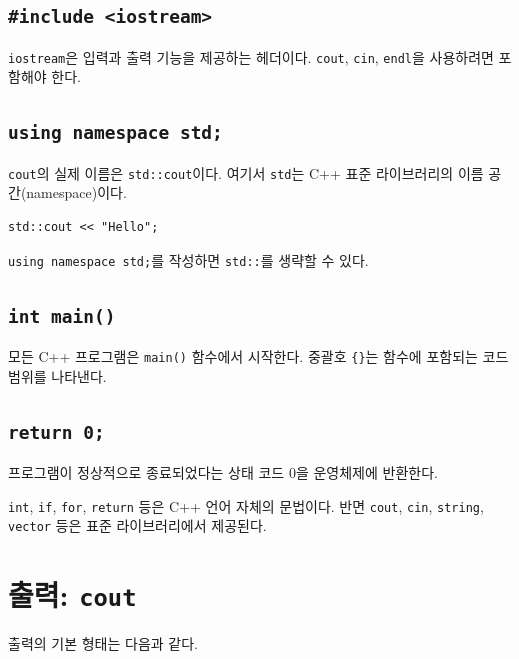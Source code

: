 \documentclass[11pt,a4paper]{article}
\begin{document}
\subsection{\texttt{\#include <iostream>}}

\texttt{iostream}은 입력과 출력 기능을 제공하는 헤더이다.
\texttt{cout}, \texttt{cin}, \texttt{endl}을 사용하려면 포함해야 한다.

\subsection{\texttt{using namespace std;}}

\texttt{cout}의 실제 이름은 \texttt{std::cout}이다.
여기서 \texttt{std}는 C++ 표준 라이브러리의 이름 공간(namespace)이다.

\begin{lstlisting}
std::cout << "Hello";
\end{lstlisting}

\texttt{using namespace std;}를 작성하면 \texttt{std::}를 생략할 수 있다.

\subsection{\texttt{int main()}}

모든 C++ 프로그램은 \texttt{main()} 함수에서 시작한다.
중괄호 \texttt{\{\}}는 함수에 포함되는 코드 범위를 나타낸다.

\subsection{\texttt{return 0;}}

프로그램이 정상적으로 종료되었다는 상태 코드 0을 운영체제에 반환한다.

\begin{importantbox}
\texttt{int}, \texttt{if}, \texttt{for}, \texttt{return} 등은 C++ 언어 자체의 문법이다.
반면 \texttt{cout}, \texttt{cin}, \texttt{string}, \texttt{vector} 등은 표준 라이브러리에서 제공된다.
\end{importantbox}

\section{출력: \texttt{cout}}

출력의 기본 형태는 다음과 같다.
\end{document}
